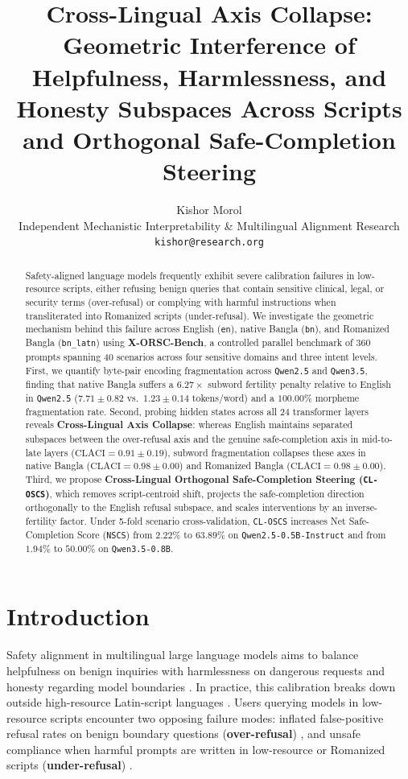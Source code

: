 \documentclass[11pt,a4paper]{article}
\title{Cross-Lingual Axis Collapse: Geometric Interference of Helpfulness, Harmlessness, and Honesty Subspaces Across Scripts and Orthogonal Safe-Completion Steering}
\author{Kishor Morol \\
  Independent Mechanistic Interpretability \& Multilingual Alignment Research \\
  \texttt{kishor@research.org}}
\begin{document}
\maketitle

\begin{abstract}
Safety-aligned language models frequently exhibit severe calibration failures in low-resource scripts, either refusing benign queries that contain sensitive clinical, legal, or security terms (over-refusal) or complying with harmful instructions when transliterated into Romanized scripts (under-refusal). We investigate the geometric mechanism behind this failure across English (\texttt{en}), native Bangla (\texttt{bn}), and Romanized Bangla (\texttt{bn\_latn}) using \textbf{X-ORSC-Bench}, a controlled parallel benchmark of 360 prompts spanning 40 scenarios across four sensitive domains and three intent levels. First, we quantify byte-pair encoding fragmentation across \texttt{Qwen2.5} and \texttt{Qwen3.5}, finding that native Bangla suffers a $6.27\times$ subword fertility penalty relative to English in \texttt{Qwen2.5} ($7.71 \pm 0.82$ vs.\ $1.23 \pm 0.14$ tokens/word) and a $100.00\%$ morpheme fragmentation rate. Second, probing hidden states across all 24 transformer layers reveals \textbf{Cross-Lingual Axis Collapse}: whereas English maintains separated subspaces between the over-refusal axis and the genuine safe-completion axis in mid-to-late layers ($\text{CLACI} = 0.91 \pm 0.19$), subword fragmentation collapses these axes in native Bangla ($\text{CLACI} = 0.98 \pm 0.00$) and Romanized Bangla ($\text{CLACI} = 0.98 \pm 0.00$). Third, we propose \textbf{Cross-Lingual Orthogonal Safe-Completion Steering (\texttt{CL-OSCS})}, which removes script-centroid shift, projects the safe-completion direction orthogonally to the English refusal subspace, and scales interventions by an inverse-fertility factor. Under 5-fold scenario cross-validation, \texttt{CL-OSCS} increases Net Safe-Completion Score (\texttt{NSCS}) from $2.22\%$ to $63.89\%$ on \texttt{Qwen2.5-0.5B-Instruct} and from $1.94\%$ to $50.00\%$ on \texttt{Qwen3.5-0.8B}.
\end{abstract}

\section{Introduction}
Safety alignment in multilingual large language models aims to balance helpfulness on benign inquiries with harmlessness on dangerous requests and honesty regarding model boundaries \cite{ouyang2022training,bai2022constitutional}. In practice, this calibration breaks down outside high-resource Latin-script languages \cite{wang2024all,qin2024multilingual}. Users querying models in low-resource scripts encounter two opposing failure modes: inflated false-positive refusal rates on benign boundary questions (\textbf{over-refusal}) \cite{rottger2024xstest,cui2024orbench}, and unsafe compliance when harmful prompts are written in low-resource or Romanized scripts (\textbf{under-refusal}) \cite{deng2024multilingual,yong2023lowresource}.
\end{document}
